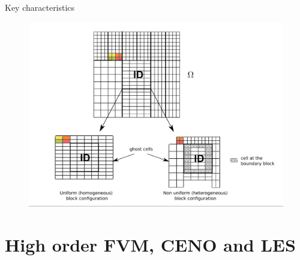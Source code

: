 \documentclass{beamer}
\begin{document}
\begin{frame}
\begin{minipage}[t][1\textheight]{1\textwidth}
\begin{exampleblock}{Key characteristics}
\begin{figure}
{\includegraphics[width=0.55\textheight, trim=2cm 0cm 1cm 0cm,clip=true]{./figs/Non-UniformBlock.png}}
\end{figure}
\vspace{-15pt}
\end{exampleblock}
\end{minipage}

\end{frame}






\section[FVM]{High order FVM, CENO and LES}
\end{document}
